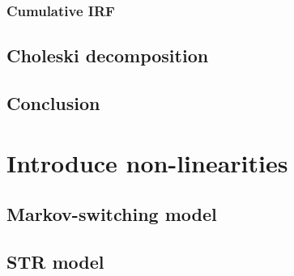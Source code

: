 \documentclass[hidelinks,12pts]{article}
\DeclareMathOperator{\1}{\mathbbm{1}}
\begin{document}
    \subsubsection{Cumulative IRF}



\subsection{Choleski decomposition}


\subsection{Conclusion}









\newpage
\section{Introduce non-linearities}\label{sec:nonlinearities}
    \subsection{Markov-switching model}\label{sec:markov}

    
    \subsection{STR model}\label{sec:str}



    
\end{document}

